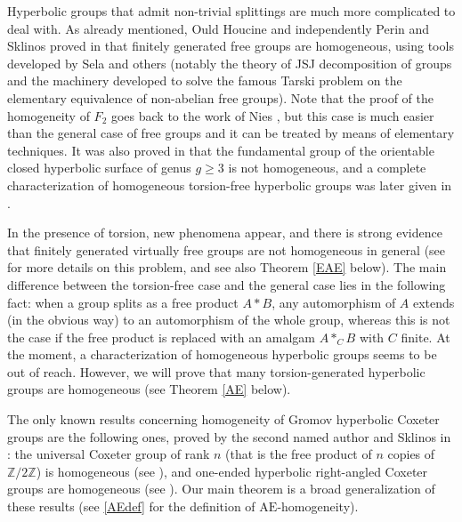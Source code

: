 \documentclass[a4paper, 11pt]{amsart}
\theoremstyle{definition}
\theoremstyle{remark}
\renewcommand{\geq}{\geqslant}
\begin{document}
\smallskip


Hyperbolic groups that admit non-trivial splittings are much more complicated to deal with. As already mentioned, Ould Houcine and independently Perin and Sklinos proved in \cite{OH11,PS12} that finitely generated free groups are homogeneous, using tools developed by Sela and others (notably the theory of JSJ decomposition of groups and the machinery developed to solve the famous Tarski problem on the elementary equivalence of non-abelian free groups). Note that the proof of the homogeneity of $F_2$ goes back to the work of Nies \cite{Nie03}, but this case is much easier than the general case of free groups and it can be treated by means of elementary techniques. It was also proved in \cite{PS12} that the fundamental group of the orientable closed hyperbolic surface of genus $g \geq 3$ is not homogeneous, and a complete characterization of homogeneous torsion-free hyperbolic groups was later given in \cite{BP19}.

\smallskip

In the presence of torsion, new phenomena appear, and there is strong evidence that finitely generated virtually free groups are not homogeneous in general (see \cite{And18b,And21} for more details on this problem, and see also Theorem \ref{EAE} below). The main difference between the torsion-free case and the general case lies in the following fact: when a group splits as a free product $A\ast B$, any automorphism of $A$ extends (in the obvious way) to an automorphism of the whole group, whereas this is not the case if the free product is replaced with an amalgam $A\ast_C B$ with $C$ finite. At the moment, a characterization of homogeneous hyperbolic groups seems to be out of reach. However, we will prove that many torsion-generated hyperbolic groups are homogeneous (see Theorem \ref{AE} below).

\smallskip

The only known results concerning homogeneity of Gromov hyperbolic Coxeter groups are the following ones, proved by the second named author and Sklinos in \cite{PS23}: the universal Coxeter group of rank $n$ (that is the free product of $n$ copies of $\mathbb{Z}/2\mathbb{Z}$) is homogeneous (see \cite[Theorems 1.4 and 4.8]{PS23}), and one-ended hyperbolic right-angled Coxeter groups are homogeneous (see \cite[Theorem 1.5 and Proposition 4.9]{PS23}). Our main theorem is a broad generalization of these results (see \ref{AEdef} for the definition of $\mathrm{AE}$-homogeneity).
\end{document}
